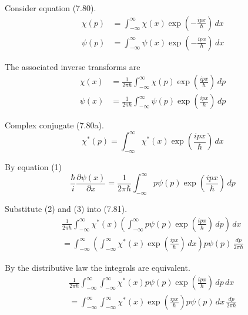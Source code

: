 


Consider equation (7.80).
\begin{align*}
\chi(p)&=\int_{-\infty}^\infty\chi(x)\exp\left(-\frac{ipx}{\hbar}\right)\,dx
\tag{7.80a}
\\
\psi(p)&=\int_{-\infty}^\infty\psi(x)\exp\left(-\frac{ipx}{\hbar}\right)\,dx
\tag{7.80b}
\end{align*}

The associated inverse transforms are
\begin{align*}
\chi(x)&=\frac{1}{2\pi\hbar}\int_{-\infty}^\infty\chi(p)\exp\left(\frac{ipx}{\hbar}\right)\,dp
\\
\psi(x)&=\frac{1}{2\pi\hbar}\int_{-\infty}^\infty\psi(p)\exp\left(\frac{ipx}{\hbar}\right)\,dp
\tag{1}
\end{align*}

Complex conjugate (7.80a).
\begin{equation*}
\chi^*(p)=\int_{-\infty}^\infty\chi^*(x)\exp\left(\frac{ipx}{\hbar}\right)\,dx
\tag{2}
\end{equation*}

By equation (1)
\begin{equation*}
\frac{\hbar}{i}\frac{\partial\psi(x)}{\partial x}=
\frac{1}{2\pi\hbar}\int_{-\infty}^\infty p\psi(p)\exp\left(\frac{ipx}{\hbar}\right)\,dp
\tag{3}
\end{equation*}

Substitute (2) and (3) into (7.81).
\begin{multline*}
\frac{1}{2\pi\hbar}\int_{-\infty}^\infty
\chi^*(x)
\left(\int_{-\infty}^\infty p\psi(p)\exp\left(\frac{ipx}{\hbar}\right)\,dp\right)
\,dx
\\
=\int_{-\infty}^\infty
\left(\int_{-\infty}^\infty\chi^*(x)\exp\left(\frac{ipx}{\hbar}\right)\,dx\right)
p\psi(p)\,\frac{dp}{2\pi\hbar}
\end{multline*}

By the distributive law the integrals are equivalent.
\begin{multline*}
\frac{1}{2\pi\hbar}\int_{-\infty}^\infty\int_{-\infty}^\infty
\chi^*(x)
p\psi(p)\exp\left(\frac{ipx}{\hbar}\right)
\,dp\,dx
\\
{}=\int_{-\infty}^\infty\int_{-\infty}^\infty
\chi^*(x)\exp\left(\frac{ipx}{\hbar}\right)
p\psi(p)
\,dx\,\frac{dp}{2\pi\hbar}
\end{multline*}



